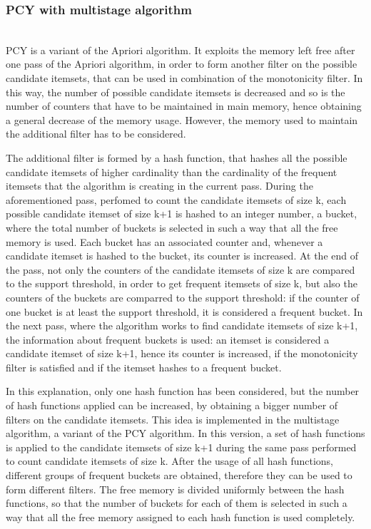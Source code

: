 \documentclass[conference,compsoc]{IEEEtran}
\theoremstyle{definition}
\begin{document}
\subsubsection{PCY with multistage algorithm} ~\\

PCY is a variant of the Apriori algorithm. It exploits the memory left free after one pass of the Apriori algorithm, in order to form another filter on the possible candidate itemsets, that can be used in combination of the monotonicity filter. In this way, the number of possible candidate itemsets is decreased and so is the number of counters that have to be maintained in main memory, hence obtaining a general decrease of the memory usage. However, the memory used to maintain the additional filter has to be considered.

The additional filter is formed by a hash function, that hashes all the possible candidate itemsets of higher cardinality than the cardinality of the frequent itemsets that the algorithm is creating in the current pass. During the aforementioned pass, perfomed to count the candidate itemsets of size k, each possible candidate itemset of size k+1 is hashed to an integer number, a bucket, where the total number of buckets is selected in such a way that all the free memory is used. Each bucket has an associated counter and, whenever a candidate itemset is hashed to the bucket, its counter is increased. At the end of the pass, not only the counters of the candidate itemsets of size k are compared to the support threshold, in order to get frequent itemsets of size k, but also the counters of the buckets are comparred to the support threshold: if the counter of one bucket is at least the support threshold, it is considered a frequent bucket. In the next pass, where the algorithm works to find candidate itemsets of size k+1, the information about frequent buckets is used: an itemset is considered a candidate itemset of size k+1, hence its counter is increased, if the monotonicity filter is satisfied and if the itemset hashes to a frequent bucket. 

In this explanation, only one hash function has been considered, but the number of hash functions applied can be increased, by obtaining a bigger number of filters on the candidate itemsets. This idea is implemented in the multistage algorithm, a variant of the PCY algorithm. In this version, a set of hash functions is applied to the candidate itemsets of size k+1 during the same pass performed to count candidate itemsets of size k. After the usage of all hash functions, different groups of frequent buckets are obtained, therefore they can be used to form different filters. The free memory is divided uniformly between the hash functions, so that the number of buckets for each of them is selected in such a way that all the free memory assigned to each hash function is used completely. 
\end{document}
